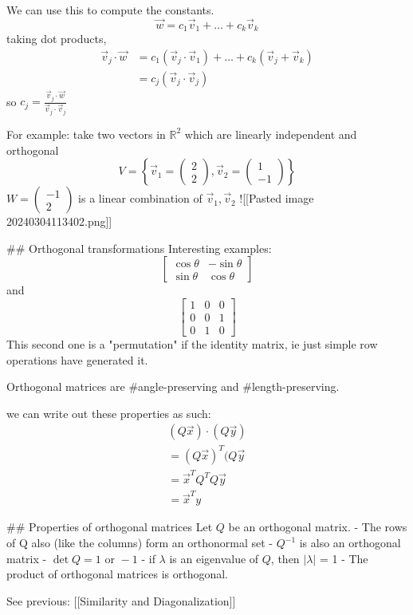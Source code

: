 We can use this to compute the constants. 
$$
\vec{w}=c_{1}\vec{v}_{1}+\dots+c_{k}\vec{v}_{k}
$$
taking dot products,
$$
\begin{align}
\vec{v}_{j}\cdot\vec{w} &= c_{1}(\vec{v}_{j}\cdot \vec{v}_{1}) + \dots + c_{k}(\vec{v}_{j}+\vec{v}_{k}) \\
 &= c_{j}(\vec{v}_{j}\cdot \vec{v}_{j})
\end{align}
$$
so $c_{j}=\frac{\vec{v}_{j}\cdot \vec{w}}{\vec{v}_{j}\cdot \vec{v}_{j}}$

For example: 
take two vectors in $\mathbb{R}^{2}$ which are linearly independent and orthogonal
$$
V = \left\{ \vec{v}_{1}=\begin{pmatrix}
2 \\ 2
\end{pmatrix} , \vec{v}_{2} = \begin{pmatrix}
1 \\ -1
\end{pmatrix}\right\}
$$
$W = \begin{pmatrix}-1 \\ 2\end{pmatrix}$ is a linear combination of $\vec{v}_{1},\vec{v}_{2}$
![[Pasted image 20240304113402.png]]

## Orthogonal transformations
Interesting examples:
$$
\begin{bmatrix}
\cos\theta & -\sin \theta \\
\sin \theta & \cos\theta 
\end{bmatrix}
$$
and 
$$
\begin{bmatrix}
1 & 0 & 0 \\
0 & 0 & 1 \\
0 & 1 & 0
\end{bmatrix}
$$
This second one is a "permutation" if the identity matrix, ie just simple row operations have generated it.

Orthogonal matrices are #angle-preserving and #length-preserving.

we can write out these properties as such:
$$
\begin{align}
(Q\vec{x})\cdot(Q\vec{y}) \\
= (Q\vec{x})^{T}(Q\vec{y} \\
= \vec{x}^{T}Q^{T}Q\vec{y} \\
= \vec{x}^{T}y
\end{align}
$$

## Properties of orthogonal matrices
Let $Q$ be an orthogonal matrix.
- The rows of Q also (like the columns) form an orthonormal set
- $Q^{-1}$ is also an orthogonal matrix
- $\det Q=1\text{ or }-1$
- if $\lambda$ is an eigenvalue of $Q$, then $\left| \lambda \right|$ = 1
- The product of orthogonal matrices is orthogonal. 


See previous: [[Similarity and Diagonalization]]
